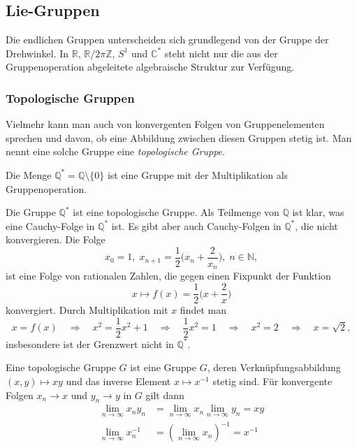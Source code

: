 %
%
%

%
%
\subsection{Lie-Gruppen
\label{buch:gruppen:subsection:lie-gruppen}}
Die endlichen Gruppen unterscheiden sich grundlegend von der Gruppe
der Drehwinkel.
In $\mathbb{R}$, $\mathbb{R}/2\pi\mathbb{Z}$, $S^1$ und $\mathbb{C}^*$
steht nicht nur die aus der Gruppenoperation abgeleitete algebraische
Struktur zur Verfügung.

%
%
\subsubsection{Topologische Gruppen}
Vielmehr kann man auch von konvergenten Folgen von Gruppenelementen
sprechen und davon, ob eine Abbildung zwischen diesen Gruppen
stetig ist.
Man nennt eine solche Gruppe eine {\em topologische Gruppe}.
%

\begin{beispiel}
Die Menge
\(
\mathbb{Q}^*
=
\mathbb{Q} \setminus\{0\}
\)
ist eine Gruppe mit der Multiplikation als Gruppenoperation.
\end{beispiel}

Die Gruppe $\mathbb{Q}^*$ ist eine topologische Gruppe.
Als Teilmenge von $\mathbb{Q}$ ist klar, was eine Cauchy-Folge in
$\mathbb{Q}^*$ ist.
Es gibt aber auch Cauchy-Folgen in $\mathbb{Q}^*$, die nicht konvergieren.
Die Folge
\[
x_0=1,\;
x_{n+1} = \frac12\biggl(x_n+\frac{2}{x_n}\biggr),\; n\in\mathbb{N},
\]
ist eine Folge von rationalen Zahlen, die gegen einen Fixpunkt der
Funktion
\[
x\mapsto f(x)=\frac12\biggl(x+\frac{2}{x}\biggr)
\]
konvergiert.
Durch Multiplikation mit $x$ findet man
\[
x=f(x)
\quad\Rightarrow\quad
x^2=\frac12 x^2 + 1
\quad\Rightarrow\quad
\frac12x^2=1
\quad\Rightarrow\quad
x^2=2
\quad\Rightarrow\quad
x=\!\sqrt{2},
\]
insbesondere ist der Grenzwert nicht in $\mathbb{Q}^*$.

\begin{definition}
\label{buch:gruppen:gruppe:def:topgruppe}
Eine topologische Gruppe $G$ ist eine Gruppe $G$, deren Verknüpfungsabbildung
$(x,y)\mapsto xy$ und das inverse Element $x\mapsto x^{-1}$ stetig sind.
Für konvergente Folgen $x_n\to x$ und $y_n\to y$ in $G$ gilt dann
\begin{align*}
\lim_{n\to \infty} x_ny_n &= \lim_{n\to\infty} x_n \lim_{n\to\infty} y_n = xy
\\
\lim_{n\to \infty} x_n^{-1} &= (\lim_{n\to\infty} x_n)^{-1} = x^{-1}
\end{align*}
\end{definition}

